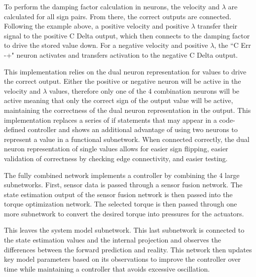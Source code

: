To perform the damping factor calculation in neurons, the velocity and $\lambda$ are 
calculated for all sign pairs. From there, the correct outputs are connected.
Following the example above, a positive velocity and positive $\lambda$ transfer
their signal to the positive C Delta output, which then connects to the damping factor 
to drive the stored value down. For a negative velocity and positive $\lambda$, the ``C Err -+" neuron activates and transfers activation to the negative C Delta output.

This implementation relies on the dual neuron representation for values to drive
the correct output. Either the positive or negative neuron will be active in the
velocity and $\lambda$ values, therefore only one of the 4 combination neurons
will be active meaning that only the correct sign of the output value will be
active, maintaining the correctness of the dual neuron representation in the 
output. This implementation replaces a series of if statements that may appear
in a code-defined controller and shows an additional advantage of using two
neurons to represent a value in a functional subnetwork. When connected 
correctly, the dual neuron representation of single values allows for easier sign flipping, easier validation of correctness
by checking edge connectivity, and easier testing.


The fully combined network implements
a controller by combining the 4 large subnetworks. First, sensor data is passed
through a sensor fusion network. The state estimation output of the sensor 
fusion network is then passed into the torque optimization network. The 
selected torque is then passed through one more subnetwork to convert the
desired torque into pressures for the actuators.

This leaves the system model subnetwork. This last subnetwork is connected to 
the state estimation values and the internal projection and observes the 
differences between the forward prediction and reality. This network then 
updates key model parameters based on its observations to improve the controller over time while 
maintaining a controller that avoids excessive oscillation. 
